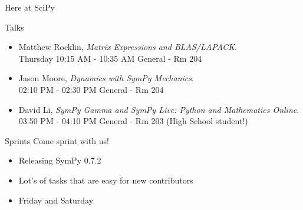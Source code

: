 \documentclass[xcolor=svgnames]{beamer}
\begin{document}
\begin{frame}{Here at SciPy}
  \begin{block}{Talks}
    \begin{itemize}
    \item Matthew Rocklin, \textit{Matrix Expressions and BLAS/LAPACK}. \\ \footnotesize Thursday 10:15
      AM - 10:35 AM General - Rm 204
    \item \normalsize Jason Moore, \textit{Dynamics with SymPy Mechanics}. \\ \footnotesize 02:10 PM - 02:30
      PM General - Rm 204
    \item \normalsize David Li, \textit{SymPy Gamma and SymPy Live: Python and Mathematics
        Online}. \\ \footnotesize 03:50 PM -
      04:10 PM General - Rm 203 (High School student!)
    \end{itemize}
  \end{block}
  \begin{block}{Sprints}
    Come sprint with us!
    \begin{itemize}
    \item Releasing SymPy 0.7.2
    \item Lot's of tasks that are easy for new contributors
    \item Friday and Saturday
    \end{itemize}
  \end{block}
\end{frame}
\end{document}
